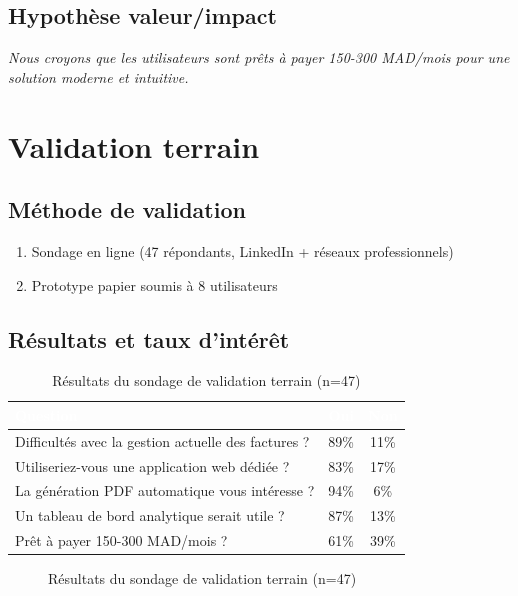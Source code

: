 \subsection{Hypothèse valeur/impact}
\textit{Nous croyons que les utilisateurs sont prêts à payer 150-300 MAD/mois pour une solution moderne et intuitive.}

\section{Validation terrain}

\subsection{Méthode de validation}
\begin{enumerate}
    \item Sondage en ligne (47 répondants, LinkedIn + réseaux professionnels)
    \item Prototype papier soumis à 8 utilisateurs
\end{enumerate}

\subsection{Résultats et taux d'intérêt}

\begin{table}[H]
\centering
\caption{Résultats du sondage de validation terrain (n=47)}
\label{tab:validation}
\begin{tabularx}{\textwidth}{|X|c|c|}
\hline
\rowcolor{emsiblue}\textcolor{white}{\textbf{Question}} & \textcolor{white}{\textbf{Oui}} & \textcolor{white}{\textbf{Non}} \\
\hline
Difficultés avec la gestion actuelle des factures ? & 89\% & 11\% \\
Utiliseriez-vous une application web dédiée ? & 83\% & 17\% \\
La génération PDF automatique vous intéresse ? & 94\% & 6\% \\
Un tableau de bord analytique serait utile ? & 87\% & 13\% \\
Prêt à payer 150-300 MAD/mois ? & 61\% & 39\% \\
\hline
\end{tabularx}
\end{table}

\begin{figure}[H]
\centering
{}
\caption{Résultats du sondage de validation terrain (n=47)}
\label{fig:validation_terrain}
\end{figure}

